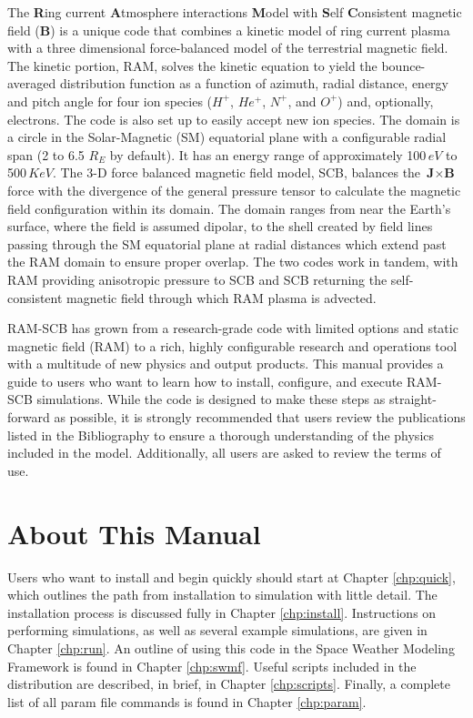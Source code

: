 The \textbf{R}ing current \textbf{A}tmosphere interactions \textbf{M}odel with \textbf{S}elf \textbf{C}onsistent magnetic field (\textbf{B}) is a unique code that combines a kinetic model of ring current plasma with a three dimensional force-balanced model of the terrestrial magnetic field.  The kinetic portion, RAM, solves the kinetic equation to yield the bounce-averaged distribution function as a function of azimuth, radial distance, energy and pitch angle for four ion species ($H^{+}$, $He^{+}$, $N^{+}$, and $O^{+}$) and, optionally, electrons. The code is also set up to easily accept new ion species. The domain is a circle in the Solar-Magnetic (SM) equatorial plane with a configurable radial span (2 to 6.5 $R_{E}$ by default).  It has an energy range of approximately 100\,$eV$ to 500\,$KeV$.  The 3-D force balanced magnetic field model, SCB, balances the $\textbf{J} \times \textbf{B}$ force with the divergence of the general pressure tensor to calculate the magnetic field configuration within its domain.  The domain ranges from near the Earth's surface, where the field is assumed dipolar, to the shell created by field lines passing through the SM equatorial plane at radial distances which extend past the RAM domain to ensure proper overlap.  The two codes work in tandem, with RAM providing anisotropic pressure to SCB and SCB returning the self-consistent magnetic field through which RAM plasma is advected.

RAM-SCB has grown from a research-grade code with limited options and static magnetic field (RAM) to a rich, highly configurable research and operations tool with a multitude of new physics and output products.  This manual provides a guide to users who want to learn how to install, configure, and execute RAM-SCB simulations.  While the code is designed to make these steps as straight-forward as possible, it is strongly recommended that users review the publications listed in the Bibliography to ensure a thorough understanding of the physics included in the model.  Additionally, all users are asked to review the terms of use.

\section{About This Manual}
Users who want to install and begin quickly should start at Chapter \ref{chp:quick}, which outlines the path from installation to simulation with little detail.  The installation process is discussed fully in Chapter \ref{chp:install}.  Instructions on performing simulations, as well as several example simulations, are given in Chapter \ref{chp:run}. An outline of using this code in the Space Weather Modeling Framework is found in Chapter \ref{chp:swmf}. Useful scripts included in the distribution are described, in brief, in Chapter \ref{chp:scripts}. Finally, a complete list of all param file commands is found in Chapter \ref{chp:param}.

